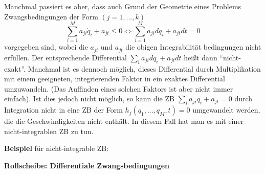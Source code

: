 \documentclass[10pt, letterpaper]{article}
\begin{document}
Manchmal passiert es aber, dass auch Grund der Geometrie eines Problems Zwangsbedingungen der Form $(j=1,...,k)$
\[\sum_{i=1}^M a_{ji} \dot{q}_i + a_{jt} \leq 0 \Leftrightarrow \sum_{i=1}^M a_{ji} dq_i + a_{jt} dt = 0\]
vorgegeben sind, wobei die $a_{ji}$ und $a_{jt}$ die obigen Integrabilität bedingungen nicht erfüllen. Der entsprechende Differential $\sum_i a_{ji} dq_i + a_{jt} dt$ heißt dann ``nicht-exakt''. Manchmal ist es dennoch möglich, dieses Differential durch Multiplikation mit einem geeigneten, integrierenden Faktor in ein exaktes Differential umzuwandeln. (Das Auffinden eines solchen Faktors ist aber nicht immer einfach). Ist dies jedoch nicht möglich, so kann die ZB $\sum_i a_{ji} \dot{q}_i + a_{jt} = 0$ durch Integration nicht in eine ZB der Form $h_j(q_1,...,q_M,t) = 0$ umgewandelt werden, die die Geschwindigkeiten nicht enthält. In diesem Fall hat man es mit einer nicht-integrablen ZB zu tun.




\textbf{Beispiel} für nicht-integrable ZB:


\textbf{Rollscheibe: Differentiale Zwangsbedingungen}
\end{document}
